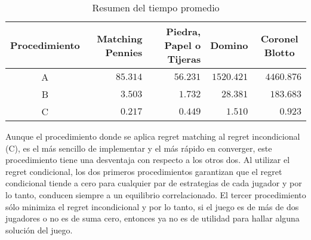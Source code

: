 \begin{table}[ht]
    \centering
    \begin{tabular}{c|r|r|r|r}
       \scriptsize{Procedimiento}  & \scriptsize{Matching Pennies} & \scriptsize{Piedra, Papel o Tijeras} & \multicolumn{1}{c|}{\scriptsize{Domino}} & \multicolumn{1}{c}{\scriptsize{Coronel Blotto}}  \\ \hline
       A & $85.314$ & $56.231$ & $1520.421$ & $4460.876$ \\
       B & $3.503$   & $1.732$ & $28.381$ & $183.683$ \\
       C & $0.217$   & $0.449$ & $1.510$ & $0.923$ \\ \hline
    \end{tabular}
    \caption{Resumen del tiempo promedio}
    \label{tab:resumen-tiempo}
\end{table}

Aunque el procedimiento donde se aplica regret matching al regret incondicional (C), es el más sencillo de implementar y el más rápido en converger, este procedimiento tiene una desventaja con respecto a los otros dos. Al utilizar el regret condicional, los dos primeros procedimientos garantizan que el regret condicional tiende a cero para cualquier par de estrategias de cada jugador y por lo tanto, conducen siempre a un equilibrio correlacionado. El tercer procedimiento sólo minimiza el regret incondicional y por lo tanto, si el juego es de más de dos jugadores o no es de suma cero, entonces ya no es de utilidad para hallar alguna solución del juego.